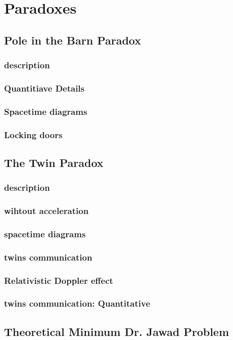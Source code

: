 
\section{Paradoxes}

\subsection{Pole in the Barn Paradox}
\subsubsection{description}
\subsubsection{Quantitiave Details}
\subsubsection{Spacetime diagrams}
\subsubsection{Locking doors}

\subsection{The Twin Paradox}
\subsubsection{description}
\subsubsection{wihtout acceleration}
\subsubsection{spacetime diagrams}
\subsubsection{twins communication}
\subsubsection{Relativistic Doppler effect}
\subsubsection{twins communication: Quantitative}

\subsection{Theoretical Minimum Dr. Jawad Problem}